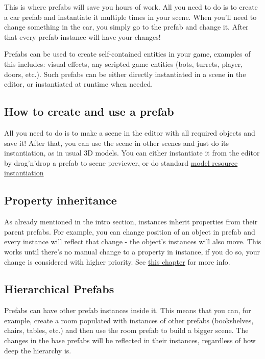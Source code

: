\documentclass[
]{book}
\theoremstyle{definition}
\theoremstyle{definition}
\theoremstyle{definition}
\theoremstyle{definition}
\theoremstyle{remark}
\begin{document}
This is where prefabs will save you hours of work. All you need to do is to create a car prefab and instantiate it multiple times in your scene. When you'll need to change something in the car, you simply go to the prefab and change it. After that every prefab instance will have your changes!

Prefabs can be used to create self-contained entities in your game, examples of this includes: visual effects, any scripted game entities (bots, turrets, player, doors, etc.). Such prefabs can be either directly instantiated in a scene in the editor, or instantiated at runtime when needed.

\subsection{How to create and use a prefab}\label{how-to-create-and-use-a-prefab}

All you need to do is to make a scene in the editor with all required objects and save it! After that, you can use the scene in other scenes and just do its instantiation, as in usual 3D models. You can either instantiate it from the editor by drag'n'drop a prefab to scene previewer, or do standard \href{../resources/model.md\#instantiation}{model resource instantiation}

\subsection{Property inheritance}\label{property-inheritance}

As already mentioned in the intro section, instances inherit properties from their parent prefabs. For example, you can change position of an object in prefab and every instance will reflect that change - the object's instances will also move. This works until there's no manual change to a property in instance, if you do so, your change is considered with higher priority. See \href{./inheritance.md}{this chapter} for more info.

\subsection{Hierarchical Prefabs}\label{hierarchical-prefabs}

Prefabs can have other prefab instances inside it. This means that you can, for example, create a room populated with instances of other prefabs (bookshelves, chairs, tables, etc.) and then use the room prefab to build a bigger scene. The changes in the base prefabs will be reflected in their instances, regardless of how deep the hierarchy is.
\end{document}
